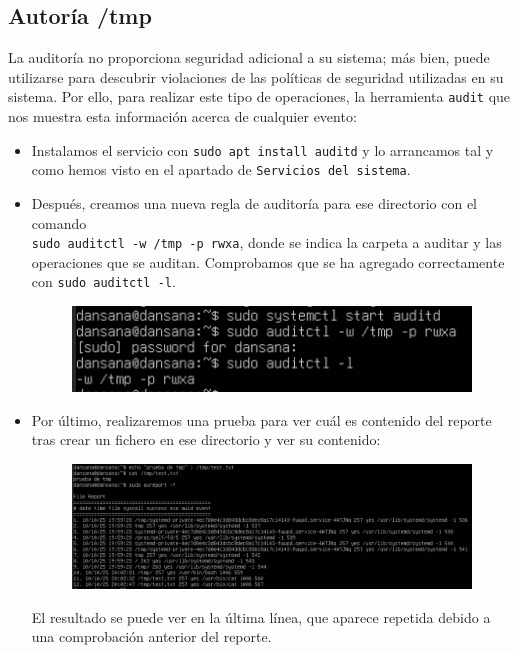 \documentclass[10pt]{article}
\begin{document}
	\subsection{Autoría /tmp}
	La auditoría no proporciona seguridad adicional a su sistema; más bien, puede utilizarse para descubrir violaciones de las políticas de seguridad utilizadas en su sistema. Por ello, para realizar este tipo de operaciones, la herramienta \verb|audit| que nos muestra esta información acerca de cualquier evento:
	\begin{itemize}
		\item Instalamos el servicio con \verb|sudo apt install auditd| y lo arrancamos tal y como hemos visto en el apartado de \verb|Servicios del sistema|.
		\item Después, creamos una nueva regla de auditoría para ese directorio con el comando \\ \verb|sudo auditctl -w /tmp -p rwxa|, donde se indica la carpeta a auditar y las operaciones que se auditan. Comprobamos que se ha agregado correctamente con \verb|sudo auditctl -l|.
		\begin{figure}[H]
			\setlength{\abovecaptionskip}{0cm}
			\setlength{\belowcaptionskip}{0cm}
			\centering
			\includegraphics[width=0.7\linewidth]{Recursos/auditoriaTMP.png}
		\end{figure}
		\item Por último, realizaremos una prueba para ver cuál es contenido del reporte tras crear un fichero en ese directorio y ver su contenido:
		\begin{figure}[H]
			\setlength{\abovecaptionskip}{0cm}
			\setlength{\belowcaptionskip}{0cm}
			\centering
			\includegraphics[width=0.9\linewidth]{Recursos/testAudit.png}
		\end{figure}
		El resultado se puede ver en la última línea, que aparece repetida debido a una comprobación anterior del reporte.
	\end{itemize}
	
\end{document}
